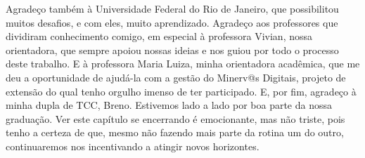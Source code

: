 \begin{agradecimentos}
Agradeço também à Universidade Federal do Rio de Janeiro, que possibilitou muitos desafios, e com eles, muito aprendizado. Agradeço aos professores que dividiram conhecimento comigo, em especial à professora Vivian, nossa orientadora, que sempre apoiou nossas ideias e nos guiou por todo o processo deste trabalho. E à professora Maria Luiza, minha orientadora acadêmica, que me deu a oportunidade de ajudá-la com a gestão do Minerv@s Digitais, projeto de extensão do qual tenho orgulho imenso de ter participado. E, por fim, agradeço à minha dupla de TCC, Breno. Estivemos lado a lado por boa parte da nossa graduação. Ver este capítulo se encerrando é emocionante, mas não triste, pois tenho a certeza de que, mesmo não fazendo mais parte da rotina um do outro, continuaremos nos incentivando a atingir novos horizontes.


\end{agradecimentos}